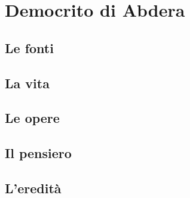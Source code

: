 \chapter{Democrito di Abdera}

\section{Le fonti}

\section{La vita}

\section{Le opere}

\section{Il pensiero}

\section{L'eredità}
